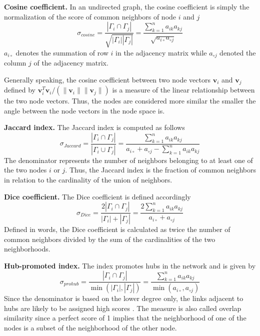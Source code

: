 \textbf{Cosine coefficient.} In an undirected graph, the cosine coefficient is simply the normalization of the score of common neighbors of node $i$ and $j$ \cite{fouss2016algorithms}
\begin{equation}
    \label{cosine}
    \sigma_{cosine} = \frac{|\Gamma_i \cap \Gamma_j|}{\sqrt{|\Gamma_i||\Gamma_j|}} = \frac{\sum_{k=1}^n a_{ik}a_{kj}}{\sqrt{a_{i \circ }a_{\circ j}}}
\end{equation}
$a_{i \circ }$ denotes the summation of row $i$ in the adjacency matrix while $a_{\circ j}$ denoted the column $j$ of the adjacency matrix.

Generally speaking, the cosine coefficient between two node vectors $\textbf{v}_i$ and $\textbf{v}_j$ defined by $\textbf{v}_i^T\textbf{v}_i/(\|\textbf{v}_i\|\|\textbf{v}_j\|)$ is a measure of the linear relationship between the two node vectors. Thus, the nodes are considered more similar the smaller the angle between the node vectors in the node space is.

\textbf{Jaccard index.} The Jaccard index is computed as follows
\begin{equation}
    \label{jaccard}
    \sigma_{Jaccard} = \frac{|\Gamma_i \cap \Gamma_j|}{|\Gamma_i \cup \Gamma_j|} = \frac{\sum_{k=1}^n a_{ik}a_{kj}}{a_{i \circ }+a_{\circ j}-\sum_{k=1}^n a_{ik}a_{kj}}
\end{equation}
The denominator represents the number of neighbors belonging to at least one of the two nodes $i$ or $j$. Thus, the Jaccard index is the fraction of common neighbors in relation to the cardinality of the union of neighbors. 

\textbf{Dice coefficient.} The Dice coefficient is defined accordingly
\begin{equation}
    \label{dice}
    \sigma_{Dice} = \frac{2 |\Gamma_i \cap \Gamma_j|}{|\Gamma_i|+|\Gamma_j|}= \frac{2\sum_{k=1}^n a_{ik}a_{kj}}{a_{i \circ }+a_{\circ j}}
\end{equation}
Defined in words, the Dice coefficient is calculated as twice the number of common neighbors divided by the sum of the cardinalities of the two neighborhoods. 

\textbf{Hub-promoted index.} The index promotes hubs in the network and is given by
\begin{equation}
    \label{prohub}
    \sigma_{prohub} = \frac{|\Gamma_i \cap \Gamma_j|}{\min(|\Gamma_i|,|\Gamma_j|)} = \frac{\sum_{k=1}^n a_{ik}a_{kj}}{\min(a_{i \circ },a_{\circ j})}
\end{equation}
Since the denominator is based on the lower degree only, the links adjacent to hubs are likely to be assigned high scores \citep{lu2011}. The measure is also called overlap similarity \citep{fouss2016algorithms} since a perfect score of 1 implies that the neighborhood of one of the nodes is a subset of the neighborhood of the other node.

